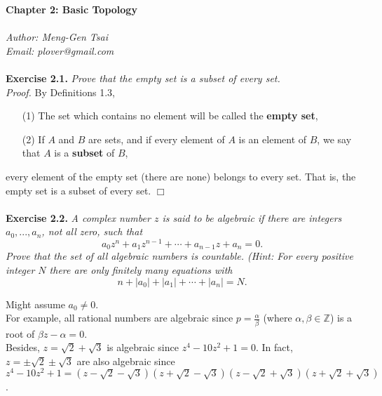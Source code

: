 \documentclass{article}
\begin{document}
\textbf{\Large Chapter 2: Basic Topology} \\\\



\emph{Author: Meng-Gen Tsai} \\
\emph{Email: plover@gmail.com} \\\\






\textbf{Exercise 2.1.}
\emph{Prove that the empty set is a subset of every set.} \\

\emph{Proof.}
By Definitions 1.3,
\begin{enumerate}
\item[(1)]
The set which contains no element will be called the \textbf{empty set},
\item[(2)]
If $A$ and $B$ are sets, and if every element of $A$ is an element of $B$,
we say that $A$ is a \textbf{subset} of $B$,
\end{enumerate}
every element of the empty set (there are none) belongs to every set.
That is, the empty set is a subset of every set.
$\Box$ \\\\






\textbf{Exercise 2.2.}
\emph{A complex number $z$ is said to be algebraic if there are integers
$a_0, ..., a_n$, not all zero, such that
$$a_0 z^n + a_1 z^{n-1} + \cdots + a_{n-1} z + a_n = 0.$$
Prove that the set of all algebraic numbers is countable.
(Hint: For every positive integer $N$ there are only finitely many equations with
$$n + |a_0| + |a_1| + \cdots + |a_n| = N.$$}

Might assume $a_0 \neq 0$. \\

For example, all rational numbers are algebraic
since $p = \frac{\alpha}{\beta}$ (where $\alpha, \beta \in \mathbb{Z}$)
is a root of $\beta z - \alpha = 0$. \\

Besides, $z = \sqrt{2} + \sqrt{3}$ is algebraic since $z^4 - 10z^2 + 1 = 0$.
In fact, $z = \pm\sqrt{2} \pm\sqrt{3}$ are also algebraic since
$z^4 - 10z^2 + 1 =
(z - \sqrt{2} - \sqrt{3})(z + \sqrt{2} - \sqrt{3})
(z - \sqrt{2} + \sqrt{3})(z + \sqrt{2} + \sqrt{3})$. \\
\end{document}
